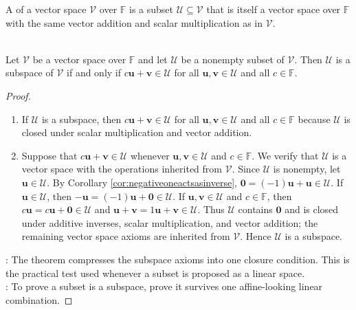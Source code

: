 \begin{definition} A  of a vector space $\mathcal{V}$ over $\mathbb{F}$ is a subset $\mathcal{U} \subseteq \mathcal{V}$ that is itself a vector space over $\mathbb{F}$ with the same vector addition and scalar multiplication as in $\mathcal{V}$.
\end{definition}

\begin{theorem} \label{thm:subspacetest} \\
Let $\mathcal{V}$ be a vector space over $\mathbb{F}$ and let $\mathcal{U}$ be a nonempty subset of $\mathcal{V}$. Then $\mathcal{U}$ is a subspace of $\mathcal{V}$ if and only if $c\mathbf{u} + \mathbf{v} \in \mathcal{U}$ for all $\mathbf{u}, \mathbf{v} \in \mathcal{U}$ and all $c \in \mathbb{F}$.
\begin{proof}
\begin{enumerate}[label=\roman*.]
\setlength{\itemsep}{0pt}
\item[$(\Rightarrow)$] If $\mathcal{U}$ is a subspace, then $c\mathbf{u}+\mathbf{v} \in \mathcal{U}$ for all $\mathbf{u}, \mathbf{v} \in \mathcal{U}$ and all $c \in \mathbb{F}$ because $\mathcal{U}$ is closed under scalar multiplication and vector addition.
\item[$(\Leftarrow)$] Suppose that $c\mathbf{u}+\mathbf{v} \in \mathcal{U}$ whenever $\mathbf{u}, \mathbf{v} \in \mathcal{U}$ and $c \in \mathbb{F}$. We verify that $\mathcal{U}$ is a vector space with the operations inherited from $\mathcal{V}$. Since $\mathcal{U}$ is nonempty, let $\mathbf{u} \in \mathcal{U}$. By Corollary \ref{cor:negativeoneactsasinverse}, $\mathbf{0} = (-1)\mathbf{u}+\mathbf{u} \in \mathcal{U}$. If $\mathbf{u} \in \mathcal{U}$, then $-\mathbf{u} = (-1)\mathbf{u}+\mathbf{0} \in \mathcal{U}$. If $\mathbf{u}, \mathbf{v} \in \mathcal{U}$ and $c \in \mathbb{F}$, then $c\mathbf{u} = c\mathbf{u}+\mathbf{0} \in \mathcal{U}$ and $\mathbf{u}+\mathbf{v} = 1\mathbf{u}+\mathbf{v} \in \mathcal{U}$. Thus $\mathcal{U}$ contains $\mathbf{0}$ and is closed under additive inverses, scalar multiplication, and vector addition; the remaining vector space axioms are inherited from $\mathcal{V}$. Hence $\mathcal{U}$ is a subspace.
\end{enumerate}
: The theorem compresses the subspace axioms into one closure condition. This is the practical test used whenever a subset is proposed as a linear space.\\
: To prove a subset is a subspace, prove it survives one affine-looking linear combination.
\end{proof}
\end{theorem}

